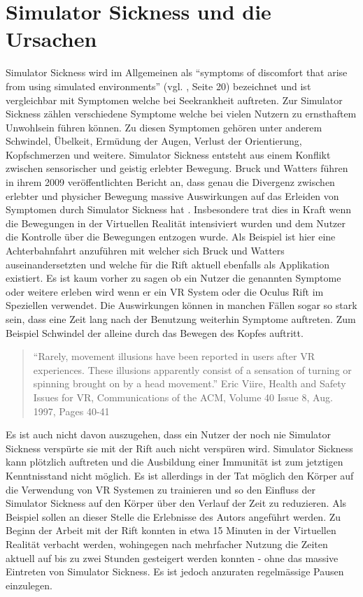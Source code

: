 \documentclass[pagesize, paper=a4, fontsize=12pt,titlepage=true, headings=small, headnosepline, abstractoff, liststotoc, nochapterprefix, plainheadsepline]{scrreprt}
\begin{document}
\section{Simulator Sickness und die Ursachen}
Simulator Sickness wird im Allgemeinen als "`symptoms of discomfort that arise from using simulated environments"' (vgl. \cite{OculusVR2014}, Seite 20) bezeichnet und ist vergleichbar mit Symptomen welche bei Seekrankheit auftreten.
Zur Simulator Sickness zählen verschiedene Symptome welche bei vielen Nutzern zu ernsthaftem Unwohlsein führen können. Zu diesen Symptomen gehören unter anderem Schwindel, Übelkeit, Ermüdung der Augen, Verlust der Orientierung, Kopfschmerzen und weitere. Simulator Sickness entsteht aus einem Konflikt zwischen sensorischer und geistig erlebter Bewegung. Bruck und Watters führen in ihrem 2009 veröffentlichten Bericht an, dass genau die Divergenz zwischen erlebter und physicher Bewegung massive Auswirkungen auf das Erleiden von Symptomen durch Simulator Sickness hat \cite{BruckWatters2009}. Insbesondere trat dies in Kraft wenn die Bewegungen in der Virtuellen Realität intensiviert wurden und dem Nutzer die Kontrolle über die Bewegungen entzogen wurde. Als Beispiel ist hier eine Achterbahnfahrt anzuführen mit welcher sich Bruck und Watters auseinandersetzten und welche für die Rift aktuell ebenfalls als  Applikation existiert. Es ist kaum vorher zu sagen ob ein Nutzer die genannten Symptome oder weitere erleben wird wenn er ein VR System oder die Oculus Rift im Speziellen verwendet. Die Auswirkungen können in manchen Fällen sogar so stark sein, dass eine Zeit lang nach der Benutzung weiterhin Symptome auftreten. Zum Beispiel Schwindel der alleine durch das Bewegen des Kopfes auftritt.
\begin{quote}
"`Rarely, movement illusions have been reported in users after VR experiences. These illusions apparently consist of a sensation of turning or spinning brought on by a head movement."' Eric Viire, Health and Safety Issues for VR, Communications of the ACM, Volume 40 Issue 8, Aug. 1997, Pages 40-41 
\cite{Viire:1997:HSI:257874.257882}
\end{quote}


Es ist auch nicht davon auszugehen, dass ein Nutzer der noch nie Simulator Sickness verspürte sie mit der Rift auch nicht verspüren wird. Simulator Sickness kann plötzlich auftreten und die Ausbildung einer Immunität ist zum jetztigen Kenntnisstand nicht möglich. Es ist allerdings in der Tat möglich den Körper auf die Verwendung von VR Systemen zu trainieren und so den Einfluss der Simulator Sickness auf den Körper über den Verlauf der Zeit zu reduzieren. Als Beispiel sollen an dieser Stelle die Erlebnisse des Autors angeführt werden. Zu Beginn der Arbeit mit der Rift konnten in etwa 15 Minuten in der Virtuellen Realität verbacht werden, wohingegen nach mehrfacher Nutzung die Zeiten aktuell auf bis zu zwei Stunden gesteigert werden konnten - ohne das massive  Eintreten von Simulator Sickness. Es ist jedoch anzuraten regelmässige Pausen einzulegen.
\end{document}
